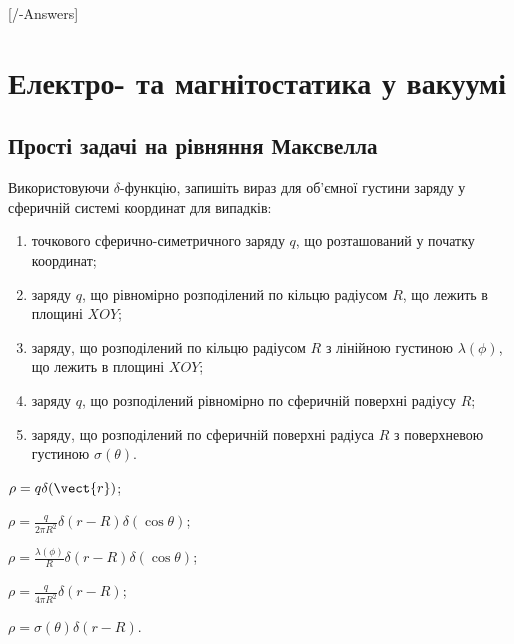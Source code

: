 
[\currfilebase/\currfilebase-Answers]
\chapter{Електро- та магнітостатика у вакуумі}\label{\currfilebase}

\section{Прості задачі на рівняння Максвелла}

\begin{problem}
Використовуючи $\delta$-функцію, запишіть вираз для об'ємної густини заряду у сферичній системі координат  для випадків:
\begin{enumerate}[label=\alph*)]
	\item точкового сферично-симетричного заряду $q$, що розташований у початку координат;
	\item заряду $q$, що рівномірно розподілений по кільцю радіусом $R$, що лежить в площині $XOY$;
	\item заряду, що розподілений по кільцю радіусом $R$ з лінійною густиною $\lambda(\phi)$, що лежить в площині $XOY$;
	\item заряду $q$, що розподілений рівномірно по сферичній  поверхні радіусу $R$;
	\item заряду, що розподілений по сферичній поверхні радіуса $R$ з поверхневою густиною $\sigma (\theta)$.
\end{enumerate}
\begin{solution}
	\begin{enumerate*}[label=\alph*)]
		\item $\rho = q\delta(\vect{r})$;
		\item $\rho = \frac{q}{2\pi R^2}\delta(r - R)\delta(\cos\theta)$;
		\item $\rho = \frac{\lambda(\phi)}{R}\delta(r - R)\delta(\cos\theta)$;
		\item $\rho = \frac{q}{4\pi R^2}\delta (r - R)$;
		\item $\rho = \sigma (\theta)\delta (r - R)$.
	\end{enumerate*}
\end{solution}
\end{problem}


